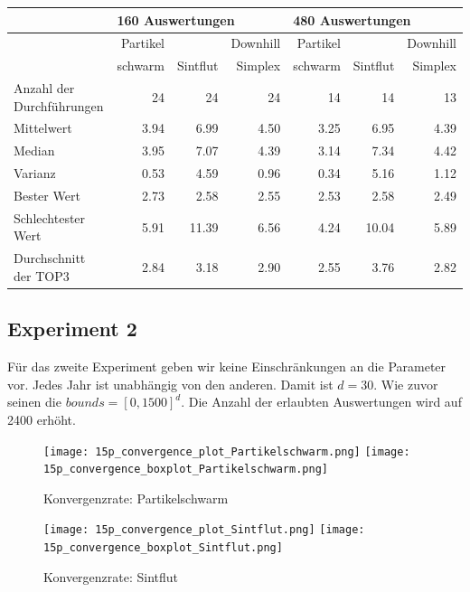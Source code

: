 \documentclass[a4paper,12pt]{article}
\begin{document}
\begin{center}
\begin{tabular}{| l || r | r | r || r | r | r ||}
\hline
        & \multicolumn{3}{l||}{160 Auswertungen} & \multicolumn{3}{l||}{480 Auswertungen} \\ \hline
        & Partikel &          & Downhill & Partikel &          & Downhill\\ 
        & schwarm  & Sintflut & Simplex  & schwarm  & Sintflut & Simplex\\ \hline
Anzahl der Durchführungen  & 24 & 24 & 24 & 14 & 14 & 13 \\ \hline
Mittelwert                 & 3.94 & 6.99 & 4.50 & 3.25 & 6.95 & 4.39 \\ \hline
Median                     & 3.95 & 7.07 & 4.39 & 3.14 & 7.34 & 4.42 \\ \hline
Varianz                    & 0.53 & 4.59 & 0.96 & 0.34 & 5.16 & 1.12 \\ \hline
Bester Wert                & 2.73 & 2.58 & 2.55 & 2.53 & 2.58 & 2.49 \\ \hline
Schlechtester Wert         & 5.91 &11.39 & 6.56 & 4.24 &10.04 & 5.89 \\ \hline
Durchschnitt der TOP3      & 2.84 & 3.18 & 2.90 & 2.55 & 3.76 & 2.82 \\ \hline
\end{tabular}
\end{center}

\subsection{Experiment 2}

Für das zweite Experiment geben wir keine Einschränkungen an die Parameter vor. Jedes Jahr ist unabhängig von den anderen. Damit ist $d = 30$. Wie zuvor seinen die $bounds = [0,1500]^d$. Die Anzahl der erlaubten Auswertungen wird auf 2400 erhöht.

\begin{figure}[h]
\texttt{[image: 15p\_convergence\_plot\_Partikelschwarm.png]}
\texttt{[image: 15p\_convergence\_boxplot\_Partikelschwarm.png]}
\caption{Konvergenzrate: Partikelschwarm}
\end{figure}

\begin{figure}[h]
\texttt{[image: 15p\_convergence\_plot\_Sintflut.png]}
\texttt{[image: 15p\_convergence\_boxplot\_Sintflut.png]}
\caption{Konvergenzrate: Sintflut}
\end{figure}
\end{document}
